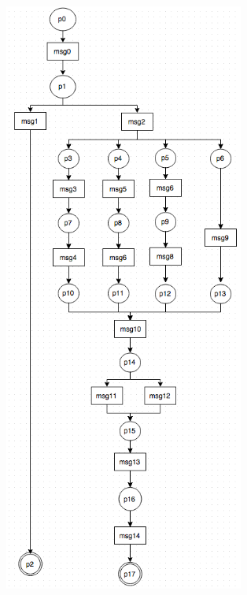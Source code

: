 \documentclass[conference]{IEEEtran}
\begin{document}
 \begin{figure} 
 \centerline{
 \includegraphics[width=3.1in]{figures/readDcache.png}}
 

\end{figure}
\end{document}
